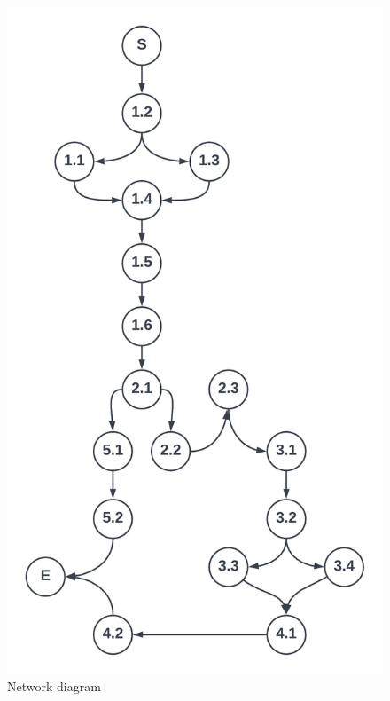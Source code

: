 \begin{figure}[H]
    \centerline{\includegraphics[width=130mm,scale=1]{figures/analysis_and_design/planning/Newtwork Diagram V2.png}}
    \caption{Network diagram}
    \label{networkDiagram}
\end{figure}

